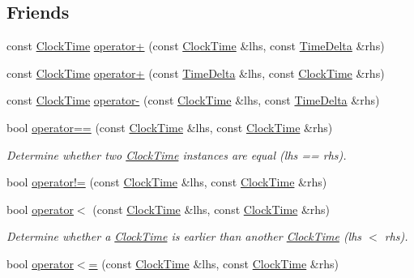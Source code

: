 \subsection*{Friends}
\begin{DoxyCompactItemize}
\item 
const \hyperlink{structClockTime}{Clock\-Time} \hyperlink{structClockTime_afceb2935d4b931a097145e4967ac71b6}{operator+} (const \hyperlink{structClockTime}{Clock\-Time} \&lhs, const \hyperlink{structTimeDelta}{Time\-Delta} \&rhs)
\item 
const \hyperlink{structClockTime}{Clock\-Time} \hyperlink{structClockTime_a5b2a233507a3e162854b69240c9c1091}{operator+} (const \hyperlink{structTimeDelta}{Time\-Delta} \&lhs, const \hyperlink{structClockTime}{Clock\-Time} \&rhs)
\item 
const \hyperlink{structClockTime}{Clock\-Time} \hyperlink{structClockTime_a21ba0831914be0b997460299bf287cf3}{operator-\/} (const \hyperlink{structClockTime}{Clock\-Time} \&lhs, const \hyperlink{structTimeDelta}{Time\-Delta} \&rhs)
\item 
bool \hyperlink{structClockTime_a69e5484eac6807a928f087cfa84637df}{operator==} (const \hyperlink{structClockTime}{Clock\-Time} \&lhs, const \hyperlink{structClockTime}{Clock\-Time} \&rhs)
\begin{DoxyCompactList}\small\item\em Determine whether two \hyperlink{structClockTime}{Clock\-Time} instances are equal (lhs == rhs). \end{DoxyCompactList}\item 
bool \hyperlink{structClockTime_a9a90069d85b56c30d69ab78e949c3911}{operator!=} (const \hyperlink{structClockTime}{Clock\-Time} \&lhs, const \hyperlink{structClockTime}{Clock\-Time} \&rhs)
\item 
bool \hyperlink{structClockTime_a1559fb2a3b03d37e75624999c9da2bc8}{operator$<$} (const \hyperlink{structClockTime}{Clock\-Time} \&lhs, const \hyperlink{structClockTime}{Clock\-Time} \&rhs)
\begin{DoxyCompactList}\small\item\em Determine whether a \hyperlink{structClockTime}{Clock\-Time} is earlier than another \hyperlink{structClockTime}{Clock\-Time} (lhs $<$ rhs). \end{DoxyCompactList}\item 
bool \hyperlink{structClockTime_ae86e4ffa336f7ef101ab39631a143c19}{operator$<$=} (const \hyperlink{structClockTime}{Clock\-Time} \&lhs, const \hyperlink{structClockTime}{Clock\-Time} \&rhs)

\end{DoxyCompactItemize}
